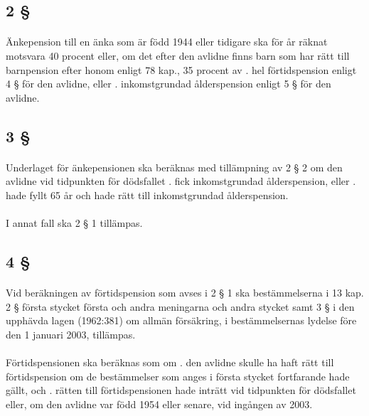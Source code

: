 \documentclass[a4paper,notitlepage,openany,10pt]{book}
\begin{document}
\subsection*{2 §}
\paragraph*{}
Änkepension till en änka som är född 1944 eller tidigare ska för år räknat motsvara 40 procent eller, om det efter den avlidne finns barn som har rätt till barnpension efter honom enligt 78 kap., 35 procent av
. hel förtidspension enligt 4 § för den avlidne, eller
. inkomstgrundad ålderspension enligt 5 § för den avlidne.
\subsection*{3 §}
\paragraph*{}
Underlaget för änkepensionen ska beräknas med tillämpning av 2 § 2 om den avlidne vid tidpunkten för dödsfallet
. fick inkomstgrundad ålderspension, eller
. hade fyllt 65 år och hade rätt till inkomstgrundad ålderspension.
\paragraph*{}
I annat fall ska 2 § 1 tillämpas.
\subsection*{4 §}
\paragraph*{}
Vid beräkningen av förtidspension som avses i 2 § 1 ska bestämmelserna i 13 kap. 2 § första stycket första och andra meningarna och andra stycket samt 3 § i den upphävda lagen (1962:381) om allmän försäkring, i bestämmelsernas lydelse före den 1 januari 2003, tillämpas.
\paragraph*{}
Förtidspensionen ska beräknas som om
. den avlidne skulle ha haft rätt till förtidspension om de bestämmelser som anges i första stycket fortfarande hade gällt, och
. rätten till förtidspensionen hade inträtt vid tidpunkten för dödsfallet eller, om den avlidne var född 1954 eller senare, vid ingången av 2003.
\end{document}
